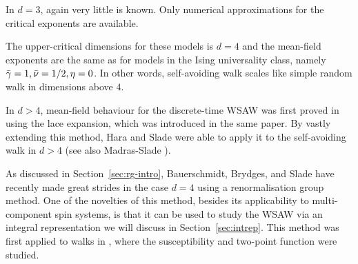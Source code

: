 In $d = 3$, again very little is known. Only numerical approximations for
the critical exponents are available.

The upper-critical dimensions for these models is $d = 4$ and the mean-field
exponents are the same as for models in the Ising universality class, namely
$\bar\gamma=1, \bar\nu = 1/2, \eta = 0$. In other words, self-avoiding walk
scales like simple random walk in dimensions above $4$.

In $d > 4$, mean-field behaviour for the discrete-time WSAW was first proved
in \cite{BS85} using the lace expansion, which was introduced in the same paper.
By vastly extending this method, Hara and Slade \REF were able to apply it to the
self-avoiding walk in $d > 4$ (see also Madras-Slade \REF).

As discussed in Section~\ref{sec:rg-intro}, Bauerschmidt, Brydges, and Slade have
recently made great strides in the case $d = 4$ using a renormalisation group method.
One of the novelties of this method, besides its applicability to multi-component
spin systems, is that it can be used to study the WSAW via an integral representation
we will discuss in Section~\ref{sec:intrep}. This method was first applied to walks
in \cite{BBS-saw4-log,BBS-saw4}, where the susceptibility and two-point function were
studied.

